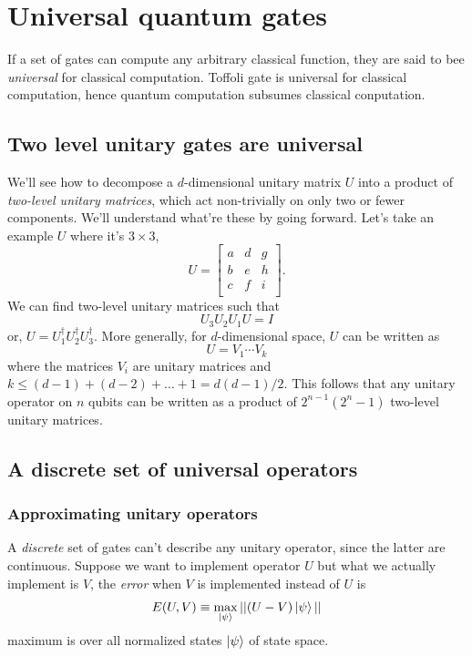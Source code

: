 \section{Universal quantum gates}
If a set of gates can compute any arbitrary classical function, they are said to bee \textit{universal} for classical computation. Toffoli gate is universal for classical computation, hence quantum computation subsumes classical conputation.
\subsection{Two level unitary gates are universal}
We'll see how to decompose a $d$-dimensional unitary matrix $U$ into a product of \textit{two-level unitary matrices}, which act non-trivially on only two or fewer components. We'll understand what're these by going forward. Let's take an example $U$ where it's $3\times3$,
\begin{equation}
    U = \begin{bmatrix}
        a & d & g \\
        b & e & h \\
        c & f & i \\
    \end{bmatrix}.
\end{equation}
We can find two-level unitary matrices such that
\begin{equation}
    U_3U_2U_1U = I
\end{equation}
or, $U=U_1^\dag U_2^\dag U_3^\dag$. More generally, for $d$-dimensional space, $U$ can be written as
\begin{equation}
    U = V_1\cdots V_k
\end{equation}
where the matrices $V_i$ are unitary matrices and $k\leq (d-1) + (d-2) + \dots + 1 = d(d-1)/2$. This follows that any unitary operator on $n$ qubits can be written as a product of $2^{n-1}(2^n-1)$ two-level unitary matrices.

\subsection{A discrete set of universal operators}
\subsubsection{Approximating unitary operators}
A \textit{discrete} set of gates can't describe any unitary operator, since the latter are continuous. Suppose we want to implement operator $U$ but what we actually implement is $V$, the \textit{error} when $V$ is implemented instead of $U$ is
\begin{equation}
    E(U,V) \equiv \max_{\ket{\psi}}||(U-V)\ket{\psi}||
\end{equation}
maximum is over all  normalized states $\ket{\psi}$ of state space.
